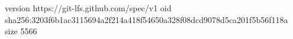 version https://git-lfs.github.com/spec/v1
oid sha256:3203f6b1ac3115694a2f214a418f54650a328f08dcd9078d5ca201f5b56f118a
size 5566
